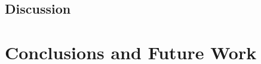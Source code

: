 \documentclass[a4paper,11pt]{article}
\numberwithin{equation}{section}
\begin{document}











\subsection{Discussion}
\label{evaluation:discussion}



\section{Conclusions and Future Work}
\label{conclusions}
\end{document}
